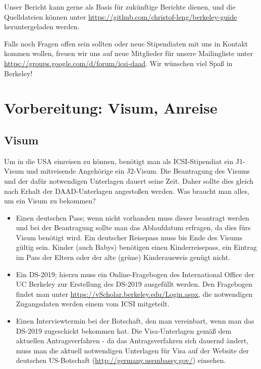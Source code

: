 \documentclass[a4paper]{scrreprt}
\begin{document}
Unser Bericht kann gerne als Basis für zukünftige Berichte dienen,
und die Quelldateien können unter \url{https://github.com/christof-leng/berkeley-guide} heruntergeladen werden.

Falls noch Fragen offen sein sollten oder neue Stipendiaten mit uns in Kontakt kommen wollen,
freuen wir uns auf neue Mitglieder für unsere Mailingliste unter \url{https://groups.google.com/d/forum/icsi-daad}.
Wir wünschen viel Spaß in Berkeley!

\tableofcontents
 
\chapter{Vorbereitung: Visum, Anreise}

\section{Visum}

Um in die USA einreisen zu können, benötigt man als ICSI-Stipendiat ein J1-Visum und mitreisende Angehörige ein J2-Visum. Die Beantragung des Visums und der dafür notwendigen Unterlagen dauert seine Zeit. Daher sollte dies gleich nach Erhalt der DAAD-Unterlagen angestoßen werden. Was braucht man alles, um ein Visum zu bekommen?

\begin{itemize}

  \item Einen deutschen Pass; wenn nicht vorhanden muss dieser beantragt werden und bei der Beantragung sollte man das Ablaufdatum erfragen, da dies fürs Visum benötigt wird. Ein deutscher Reisepass muss bis Ende des Visums gültig sein. Kinder (auch Babys) benötigen einen Kinderreisepass, ein Eintrag im Pass der Eltern oder der alte (grüne) Kinderausweis genügt nicht.

	\item Ein DS-2019; hierzu muss ein Online-Fragebogen des International Office der UC Berkeley zur Erstellung des DS-2019 ausgefüllt werden. Den Fragebogen findet man unter \url{https://vScholar.berkeley.edu/Login.aspx}, die notwendigen Zugangsdaten werden einem vom ICSI mitgeteilt.
	
	\item Einen Interviewtermin bei der Botschaft, den man vereinbart, wenn man das DS-2019 zugeschickt bekommen hat. Die Visa-Unterlagen gemäß dem aktuellen Antragsverfahren - da das Antragsverfahren sich dauernd ändert, muss man die aktuell notwendigen Unterlagen für Visa auf der Website der deutschen US-Botschaft (\url{http://germany.usembassy.gov/}) einsehen.

\end{itemize}
\end{document}
